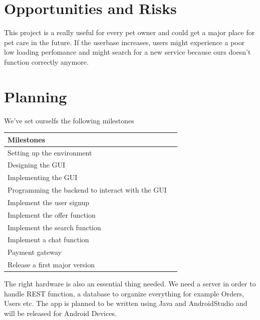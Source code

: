 \documentclass[12pt]{article}
\theoremstyle{definition}
\newenvironment{explanation}{%
}{}
\begin{document}
\section{Opportunities and Risks}
\begin{explanation}
This project is a really useful for every pet owner and could get a major place for pet care in the future.
\newline
If the userbase increases, users might experience a poor low loading perfomance and might search for a new service because ours doesn't function correctly anymore.
\end{explanation}
\pagebreak
\section{Planning}
\begin{explanation}
We've set ourselfs the following milestones 
\begin{flushleft}
\begin{tabular}{|l|l|} \hline
Milestones \\ \hline
Setting up the environment \\ \hline
Designing the GUI \\ \hline
Implementing the GUI \\ \hline
Programming the backend to interact with the GUI \\ \hline
Implement the user signup \\ \hline
Implement the offer function \\ \hline
Implement the search function \\ \hline
Implement a chat function \\ \hline
Payment gateway \\ \hline
Release a first major version \\ \hline
\end{tabular}
\end{flushleft}
The right hardware is also an essential thing needed.
\newline
We need a server in order to handle REST function, a database to organize everything for example Orders, Users etc.
\newline
The app is planned to be written using Java and AndroidStudio and will be released for Android Devices.
\end{explanation}
\end{document}
